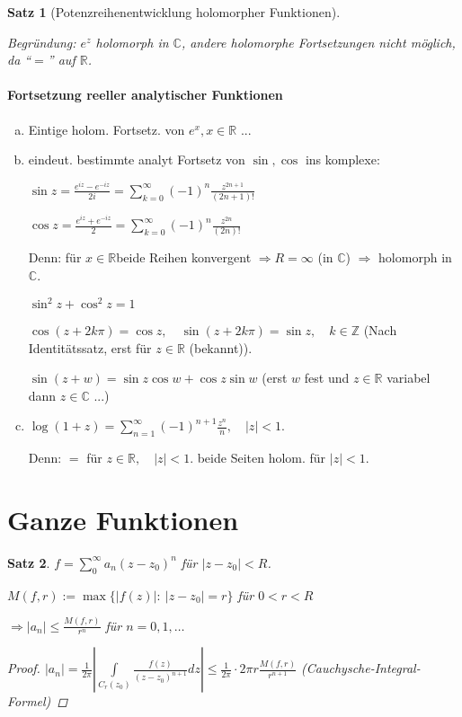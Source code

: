 \documentclass[ngerman,halfparskip]{scrartcl}
\newtheorem{satz}{Satz}[section]
\theoremstyle{definition}
\def\R{\mathbb R}
\def\C{\mathbb C}
\def\Z{\mathbb Z}
\begin{document}
\begin{satz}[Potenzreihenentwicklung holomorpher Funktionen]
\begin{enumerate}[a)]
Begründung: $e^z$ holomorph in $\C$, andere holomorphe Fortsetzungen nicht möglich, da "`$=$"' auf $\R$.
\end{enumerate}


\end{satz}



\paragraph{Fortsetzung reeller analytischer Funktionen}
\begin{enumerate}[a)]
\item Eintige holom. Fortsetz. von $e^x, x\in\R$ ...
\item eindeut. bestimmte analyt Fortsetz von $\sin, \cos$ ins komplexe:

$\sin z=\frac{e^{iz}-e^{-iz}}{2i}=\sum\limits_{k=0}^\infty (-1)^n\frac {z^{2n+1}}{(2n+1)!}$

$\cos z=\frac{e^{iz}+e^{-iz}}{2}=\sum\limits_{k=0}^\infty (-1)^n\frac {z^{2n}}{(2n)!}$

Denn: für $x\in\R $beide Reihen konvergent $ \Rightarrow R=\infty $ (in $\C$) $\Rightarrow $ holomorph in $\C$.

$\sin^2z+\cos^2z=1$

$\cos(z+2k\pi)=\cos z, \quad \sin(z+2k\pi)=\sin z, \quad k\in\Z$ (Nach Identitätssatz, erst für $z\in\R$ (bekannt)).

$\sin(z+w)=\sin z\cos w + \cos z \sin w$ (erst $w$ fest und $z\in\R $ variabel dann $z\in\C$  ...)

\item $\log(1+z)=\sum\limits_{n=1}^{\infty} (-1)^{n+1}\frac{z^n}{n}, \quad |z|<1$.

Denn: $=$ für $z\in\R, \quad |z|<1$. beide Seiten holom. für $|z|<1$.
\end{enumerate}



\section{Ganze Funktionen}%
\begin{satz}
$f=\sum\limits_0^\infty a_n(z-z_0)^n$ für $|z-z_0|<R$.

$M(f,r):=\max\{|f(z)| :~ |z-z_0|=r\} $ für $0<r<R$

$\Rightarrow |a_n|\leq \frac{M(f,r)}{r^n}$ für $n=0,1,\ldots$

\begin{proof}
$|a_n|=\frac{1}{2\pi}\left | \int\limits_{C_r(z_0)} \frac{f(z)}{(z-z_0)^{n+1}} dz \right | \leq \frac 1 {2\pi} \cdot 2 \pi r \frac{M(f,r)}{r^{n+1}}$ (Cauchysche-Integral-Formel)
\end{proof}

\end{satz}
\end{document}
